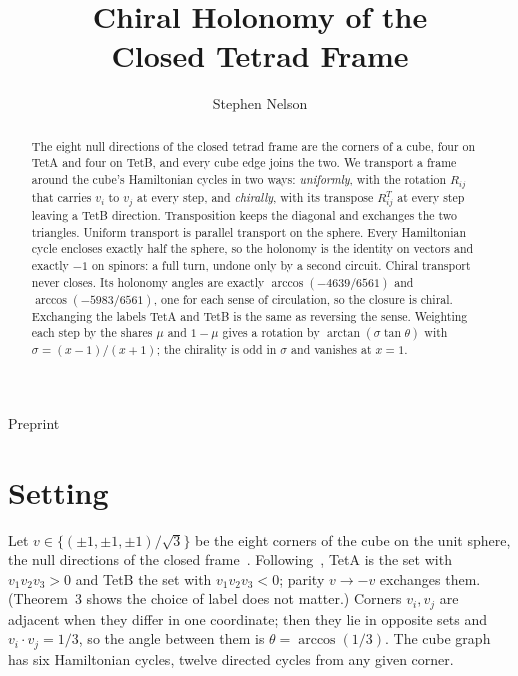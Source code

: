 \documentclass[twocolumn]{iopjournal}
\renewcommand{\articletype}[1]{%
  {\vspace*{-8mm}\noindent \Large \sf Preprint}\par
  \vspace*{6mm}\noindent{\scriptsize \sf{\bfseries \MakeUppercase{#1}}}}
\begin{document}
\articletype{Supplementary Material}

\title{Chiral Holonomy of the\\
Closed Tetrad Frame}

\author{Stephen Nelson}



\begin{abstract}
The eight null directions of the closed tetrad frame are the
corners of a cube, four on TetA and four on TetB, and every cube edge
joins the two. We transport a frame around the cube's Hamiltonian
cycles in two ways: \emph{uniformly}, with the rotation $R_{ij}$ that
carries $v_i$ to $v_j$ at every step, and \emph{chirally}, with its
transpose $R_{ij}^T$ at every step leaving a TetB direction.
Transposition keeps the diagonal and exchanges the two triangles.
Uniform transport is parallel transport on the sphere. Every
Hamiltonian cycle encloses exactly half the sphere, so the holonomy is
the identity on vectors and exactly $-1$ on spinors: a full turn,
undone only by a second circuit. Chiral transport never closes. Its
holonomy angles are exactly $\arccos(-4639/6561)$ and
$\arccos(-5983/6561)$, one for each sense of circulation, so the
closure is chiral. Exchanging the labels TetA and TetB is the same as
reversing the sense. Weighting each step by the shares $\mu$ and
$1-\mu$ gives a rotation by $\arctan(\sigma\tan\theta)$ with
$\sigma = (x-1)/(x+1)$; the chirality is odd in $\sigma$ and vanishes
at $x = 1$.
\end{abstract}



\section*{Setting}

Let $v \in \{(\pm1, \pm1, \pm1)/\sqrt3\}$ be the eight corners of the
cube on the unit sphere, the null directions of the closed
frame~\cite{L1,L3holonomy}. Following~\cite{L3holonomy}, TetA is the
set with $v_1v_2v_3 > 0$ and TetB the set with $v_1v_2v_3 < 0$; parity
$v \to -v$ exchanges them. (Theorem~3 shows the choice of label does
not matter.) Corners $v_i, v_j$ are adjacent when they
differ in one coordinate; then they lie in opposite sets and
$v_i\cdot v_j = 1/3$, so the angle between them is
$\theta = \arccos(1/3)$. The cube graph has six Hamiltonian cycles,
twelve directed cycles from any given corner.
\end{document}
